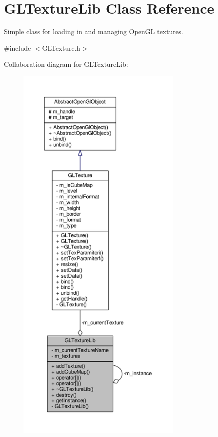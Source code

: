 \hypertarget{class_g_l_texture_lib}{\section{G\-L\-Texture\-Lib Class Reference}
\label{class_g_l_texture_lib}
}


Simple class for loading in and managing Open\-G\-L textures.  




{\ttfamily \#include $<$G\-L\-Texture.\-h$>$}



Collaboration diagram for G\-L\-Texture\-Lib\-:\nopagebreak
\begin{figure}[H]
\begin{center}
\leavevmode
\includegraphics[height=550pt]{class_g_l_texture_lib__coll__graph}
\end{center}
\end{figure}
